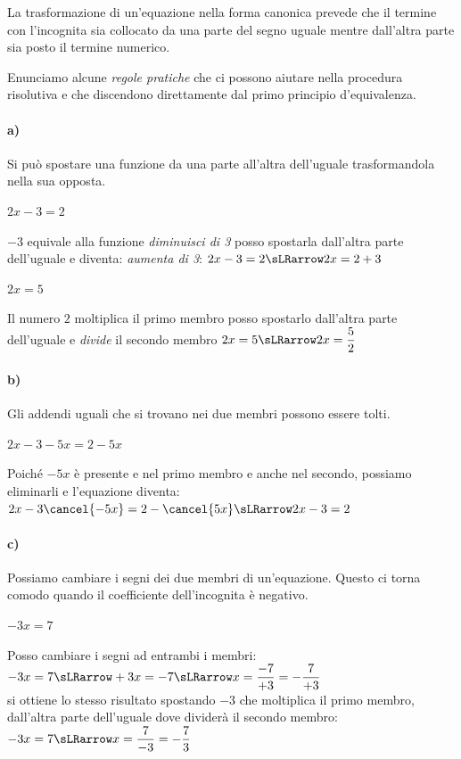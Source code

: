 \osservazione
La trasformazione di un'equazione nella forma canonica
prevede che il termine con l'incognita sia collocato da
una parte del segno uguale mentre dall'altra parte sia
posto il termine numerico.

Enunciamo alcune \emph{regole pratiche} che ci possono aiutare nella
procedura risolutiva e che discendono direttamente dal primo principio
d'equivalenza.

\paragraph{a)} 
Si può spostare una funzione da una parte all'altra dell'uguale
trasformandola nella sua opposta.

\begin{esempio}
\(2x-3=2\)

\(-3\) equivale alla funzione \emph{diminuisci di 3} 
posso spostarla dall'altra parte dell'uguale e diventa:
\emph{aumenta di 3}:
\(2x-3=2 \sLRarrow 2x=2+3\)
\end{esempio}

\begin{esempio}
\(2x=5\)

Il numero \(2\) moltiplica il primo membro 
posso spostarlo dall'altra parte dell'uguale e
\emph{divide} il secondo membro
\(2x=5 \sLRarrow 2x=\dfrac{5}{2}\)
\end{esempio}

\paragraph{b)}
Gli addendi uguali che si trovano nei due membri possono essere tolti.

\begin{esempio}
\(2x-3-5x=2-5x\)

Poiché \(-5x\) è presente e nel primo membro e anche nel secondo, 
possiamo eliminarli e l'equazione diventa:
\(2x-3\cancel{-5x}=2-\cancel{5x} \sLRarrow 2x-3=2\)
\end{esempio}

\paragraph{c)} 
Possiamo cambiare i segni dei due membri di un'equazione. 
Questo ci torna comodo quando il coefficiente dell'incognita è negativo.

\begin{esempio}
\(-3x=7\)

Posso cambiare i segni ad entrambi i membri:
\(-3x=7 \sLRarrow +3x=-7 \sLRarrow x=\dfrac{-7}{+3}=-\dfrac{7}{+3}\)\\
si ottiene lo stesso risultato spostando \(-3\) che moltiplica il primo 
membro, dall'altra parte dell'uguale dove dividerà il secondo membro:
\(-3x=7 \sLRarrow x=\dfrac{7}{-3}=-\dfrac{7}{3}\)
\end{esempio}

